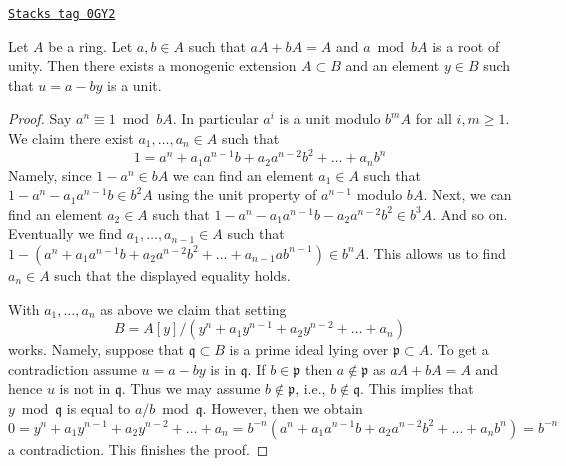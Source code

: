 \begin{lemma}
\label{etale-cohomology-lemma-find-extension}
\href{https://stacks.math.columbia.edu/tag/0GY2}{\texttt{Stacks tag 0GY2}}

Let $A$ be a ring. Let $a, b \in A$ such that
$aA + bA = A$ and $a \bmod bA$ is a root of unity.
Then there exists a monogenic extension $A \subset B$
and an element $y \in B$ such that $u = a - by$ is a unit.
\end{lemma}

\begin{proof}
Say $a^n \equiv 1 \bmod bA$. In particular $a^i$ is a unit modulo
$b^mA$ for all $i, m \geq 1$. We claim there exist
$a_1, \ldots, a_n \in A$ such that
$$
1 = a^n + a_1 a^{n - 1}b + a_2 a^{n - 2}b^2 + \ldots + a_n b^n
$$
Namely, since $1 - a^n \in bA$ we can find an element $a_1 \in A$
such that $1 - a^n - a_1 a^{n - 1} b \in b^2A$ using the unit property
of $a^{n - 1}$ modulo $bA$. Next, we can find an element $a_2 \in A$
such that $1 - a^n - a_1 a^{n - 1} b - a_2 a^{n - 2} b^2 \in b^3A$.
And so on. Eventually we find $a_1, \ldots, a_{n - 1} \in A$
such that $1 - (a^n + a_1 a^{n - 1}b + a_2 a^{n - 2}b^2 +
\ldots + a_{n - 1} ab^{n - 1}) \in b^nA$. This allows us to find
$a_n \in A$ such that the displayed equality holds.

\medskip\noindent
With $a_1, \ldots, a_n$ as above we claim that setting
$$
B = A[y]/(y^n + a_1 y^{n - 1} + a_2 y^{n - 2} + \ldots + a_n)
$$
works. Namely, suppose that $\mathfrak q \subset B$ is a prime ideal
lying over $\mathfrak p \subset A$. To get a contradiction
assume $u = a - by$ is in $\mathfrak q$. If $b \in \mathfrak p$
then $a \not \in \mathfrak p$ as $aA + bA = A$ and hence $u$ is not
in $\mathfrak q$. Thus we may assume $b \not \in \mathfrak p$, i.e.,
$b \not \in \mathfrak q$. This implies that $y \bmod \mathfrak q$
is equal to $a/b \bmod \mathfrak q$. However, then we obtain
$$
0 = y^n + a_1 y^{n - 1} + a_2 y^{n - 2} + \ldots + a_n =
b^{-n}(a^n + a_1 a^{n - 1}b + a_2 a^{n - 2}b^2 + \ldots + a_nb^n) =
b^{-n}
$$
a contradiction. This finishes the proof.
\end{proof}

